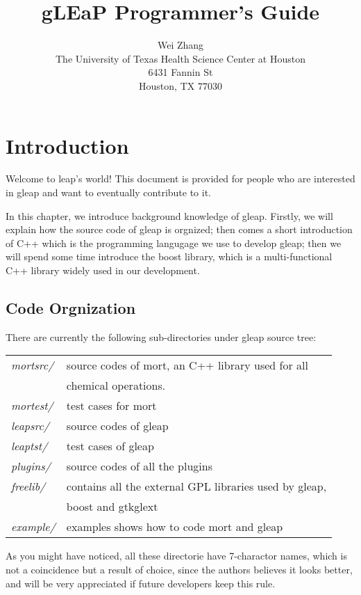 \documentclass[letterpaper]{book}
\title{gLEaP Programmer's Guide}
\author{Wei Zhang\\The University of Texas Health Science Center at Houston\\6431 Fannin St\\Houston, TX 77030}
\begin{document}
\maketitle


\chapter{Introduction}

  Welcome to leap's world! This document is provided for people who are interested in 
gleap and want to eventually contribute to it. 

  In this chapter, we introduce background knowledge of gleap. Firstly, we will
explain how the source code of gleap is orgnized; then comes a short introduction of 
C++ which is the programming langugage we use to develop gleap; then we will spend
some time introduce the boost library, which is a multi-functional C++ library widely 
used in our development.


\section{Code Orgnization}
  There are currently the following sub-directories under gleap source tree:


\begin{tabular}{ll}
   {\it mortsrc/}   & source codes of mort,  an C++ library used for all \\
                    & chemical operations. \\

   {\it mortest/}   &  test cases for mort \\

   {\it leapsrc/}   &  source codes of gleap \\

   {\it leaptst/}   &  test cases of gleap \\

   {\it plugins/}   &  source codes of all the plugins \\

   {\it freelib/}   &  contains all the external GPL libraries used by gleap, \\
                    &  boost and gtkglext \\
   {\it example/}   &  examples shows how to code mort and gleap

\end{tabular}

  As you might have noticed, all these directorie have 7-charactor names, which
is not a coincidence but a result of choice, since the authors believes it looks
better, and will be very appreciated if future developers keep this rule.
\end{document}
